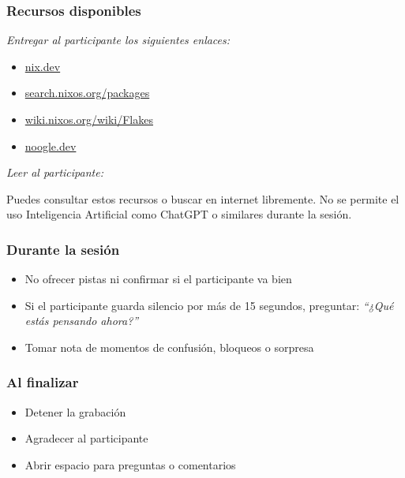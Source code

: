 \subsubsection{Recursos disponibles}

\emph{Entregar al participante los siguientes enlaces:}

\begin{itemize}
\item \href{https://nix.dev}{nix.dev}
\item \href{https://search.nixos.org/packages}{search.nixos.org/packages}
\item \href{https://wiki.nixos.org/wiki/Flakes}{wiki.nixos.org/wiki/Flakes}
\item \href{https://noogle.dev}{noogle.dev}
\end{itemize}

\emph{Leer al participante:}

\begin{cajagris}
Puedes consultar estos recursos o buscar en internet libremente. No se permite el uso Inteligencia Artificial como ChatGPT o similares durante la sesión.
\end{cajagris}

\subsubsection{Durante la sesión}

\begin{itemize}
\item No ofrecer pistas ni confirmar si el participante va bien
\item Si el participante guarda silencio por más de 15 segundos, preguntar: \emph{``¿Qué estás pensando ahora?''}
\item Tomar nota de momentos de confusión, bloqueos o sorpresa
\end{itemize}

\subsubsection{Al finalizar}

\begin{itemize}
\item Detener la grabación
\item Agradecer al participante
\item Abrir espacio para preguntas o comentarios
\end{itemize}

